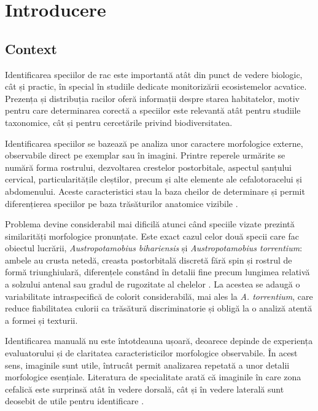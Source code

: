 \chapter{Introducere}\label{chapter:cap1}


\section{Context}

Identificarea speciilor de rac este importantă atât din punct de vedere biologic, cât și practic, în special în studiile dedicate monitorizării ecosistemelor acvatice. Prezența și distribuția racilor oferă informații despre starea habitatelor, motiv pentru care determinarea corectă a speciilor este relevantă atât pentru studiile taxonomice, cât și pentru cercetările privind biodiversitatea.

Identificarea speciilor se bazează pe analiza unor caractere morfologice externe, observabile direct pe exemplar sau în imagini. Printre reperele urmărite se numără forma rostrului, dezvoltarea crestelor postorbitale, aspectul șanțului cervical, particularitățile cleștilor, precum și alte elemente ale cefalotoracelui și abdomenului. Aceste caracteristici stau la baza cheilor de determinare și permit diferențierea speciilor pe baza trăsăturilor anatomice vizibile \cite{parvulescu2009}.

Problema devine considerabil mai dificilă atunci când speciile vizate prezintă similarități morfologice pronunțate. Este exact cazul celor două specii care fac obiectul lucrării, \textit{Austropotamobius bihariensis} și \textit{Austropotamobius torrentium}: ambele au crusta netedă, creasta postorbitală discretă fără spin și rostrul de formă triunghiulară, diferențele constând în detalii fine precum lungimea relativă a solzului antenal sau gradul de rugozitate al chelelor \cite{parvulescu2009}. La acestea se adaugă o variabilitate intraspecifică de colorit considerabilă, mai ales la \textit{A. torrentium}, care reduce fiabilitatea culorii ca trăsătură discriminatorie și obligă la o analiză atentă a formei și texturii.

Identificarea manuală nu este întotdeauna ușoară, deoarece depinde de experiența evaluatorului și de claritatea caracteristicilor morfologice observabile. În acest sens, imaginile sunt utile, întrucât permit analizarea repetată a unor detalii morfologice esențiale. Literatura de specialitate arată că imaginile în care zona cefalică este surprinsă atât în vedere dorsală, cât și în vedere laterală sunt deosebit de utile pentru identificare \cite{parvulescu2009}.

